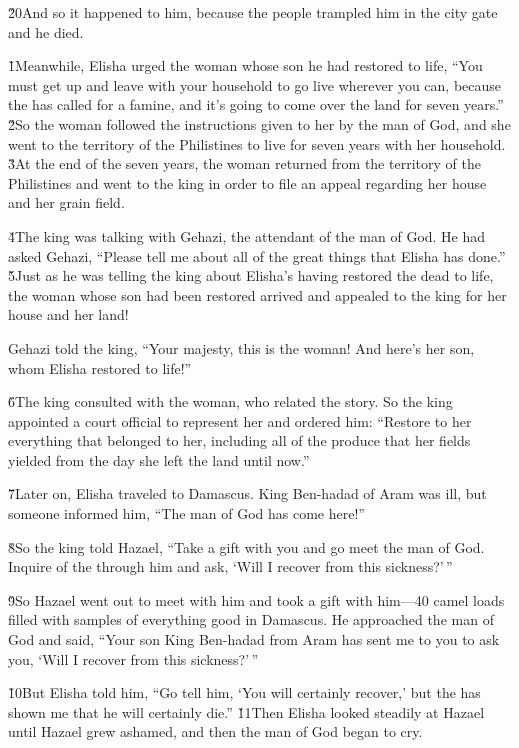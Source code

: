 \v{20}And so it happened to him, because the people trampled him in the city gate and he died.

\v{1}Meanwhile, Elisha urged the woman whose son he had restored to life, ``You must get up and leave with your household to go live wherever you can, because the  has called for a famine, and it's going to come over the land for seven years.'' \v{2}So the woman followed the instructions given to her by the man of God, and she went to the territory of the Philistines to live for seven years with her household. \v{3}At the end of the seven years, the woman returned from the territory of the Philistines and went to the king in order to file an appeal regarding her house and her grain field.

\v{4}The king was talking with Gehazi, the attendant of the man of God. He had asked Gehazi, ``Please tell me about all of the great things that Elisha has done.'' \v{5}Just as he was telling the king about Elisha's having restored the dead to life, the woman whose son had been restored arrived and appealed to the king for her house and her land!

Gehazi told the king, ``Your majesty, this is the woman! And here's her son, whom Elisha restored to life!''

\v{6}The king consulted with the woman, who related the story. So the king appointed a court official to represent her and ordered him: ``Restore to her everything that belonged to her, including all of the produce that her fields yielded from the day she left the land until now.''

\v{7}Later on, Elisha traveled to Damascus. King Ben-hadad of Aram was ill, but someone informed him, ``The man of God has come here!''

\v{8}So the king told Hazael, ``Take a gift with you and go meet the man of God. Inquire of the  through him and ask, `Will I recover from this sickness?'\,''

\v{9}So Hazael went out to meet with him and took a gift with him---40 camel loads filled with samples of everything good in Damascus. He approached the man of God and said, ``Your son King Ben-hadad from Aram has sent me to you to ask you, `Will I recover from this sickness?'\,''

\v{10}But Elisha told him, ``Go tell him, `You will certainly recover,' but the  has shown me that he will certainly die.'' \v{11}Then Elisha looked steadily at Hazael until Hazael grew ashamed, and then the man of God began to cry.

